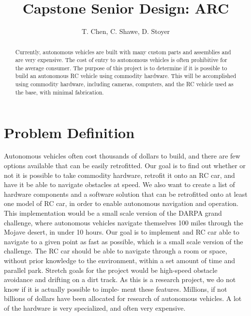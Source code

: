 \documentclass[draftclsnofoot,onecolumn,10pt]{IEEEtran}
\begin{document}
\begin{titlepage}
\title{Capstone Senior Design: ARC}
\author{T. Chen, C. Shawe, D. Stoyer}
\maketitle
\begin{abstract}
Currently, autonomous vehicles are built with many custom parts and assemblies
and are very expensive. The cost of entry to autonomous vehicles is often
prohibitive for the average consumer. The purpose of this project is to determine
if it is possible to build an autonomous RC vehicle using commodity hardware.
This will be accomplished using commodity hardware, including cameras, computers,
and the RC vehicle used as the base, with minimal fabrication.
\end{abstract}

\thispagestyle{empty} %

\end{titlepage}


\newpage

\section{Problem Definition}
Autonomous vehicles often cost thousands of dollars to build, and there are few
options available that can be easily retrofitted. Our goal is to find out whether
or not it is possible to take commodity hardware, retrofit it onto an RC car, and
have it be able to navigate obstacles at speed. We also want to create a list of
hardware components and a software solution that can be retrofitted onto at least
one model of RC car, in order to enable autonomous navigation and operation.
This implementation would be a small scale version of the DARPA grand challenge,
where autonomous vehicles navigate themselves 100 miles through the Mojave desert,
in under 10 hours. Our goal is to implement and RC car able to navigate to a given
point as fast as possible, which is a small scale version of the challenge. The RC
car should be able to navigate through a room or space, without prior knowledge to
the environment, within a set amount of time and parallel park. Stretch goals for
the project would be high-speed obstacle avoidance and drifting on a dirt track.
As this is a research project, we do not know if it is actually possible to imple-
ment these features. Millions, if not billions of dollars have been allocated for
research of autonomous vehicles. A lot of the hardware is very specialized, and
often very expensive.
\end{document}
